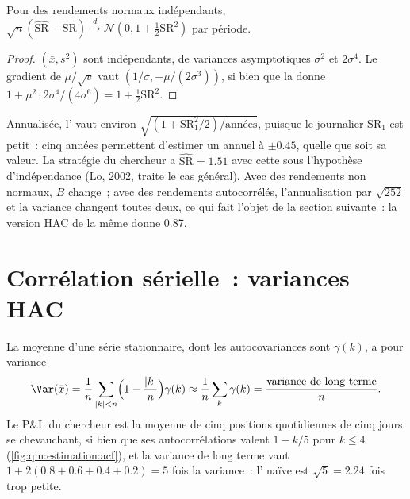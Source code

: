 \begin{proposition}\label{prop:qm:estimation:srse}
Pour des rendements normaux indépendants, $\sqrt n(\widehat{\mathrm{SR}} - \mathrm{SR}) \xrightarrow{d} \mathcal N(0, 1 + \tfrac12\mathrm{SR}^2)$ par période.
\end{proposition}

\begin{proof}
$(\bar x, s^2)$ sont indépendants, de variances asymptotiques $\sigma^2$ et $2\sigma^4$. Le gradient de $\mu/\sqrt v$ vaut $(1/\sigma,
-\mu/(2\sigma^3))$, si bien que la  donne $1 + \mu^2\cdot2\sigma^4/(4\sigma^6) = 1 + \tfrac12\mathrm{SR}^2$.
\end{proof}

Annualisée, l' vaut environ $\sqrt{(1 + \mathrm{SR}_1^2/2)/\text{années}}$, puisque le  journalier $\mathrm{SR}_1$ est petit~:
cinq années permettent d'estimer un  annuel à $\pm 0.45$, quelle que soit sa valeur. La stratégie du chercheur a $\widehat{\mathrm{SR}} = 1.51$
avec cette  sous l'hypothèse d'indépendance (Lo, 2002, traite le cas général). Avec des rendements non normaux, $B$ change~;
avec des rendements autocorrélés, l'annualisation par $\sqrt{252}$ et la variance changent toutes deux, ce qui fait l'objet de la section suivante~:
la version HAC de la même  donne 0.87.

\section{Corrélation sérielle~: variances HAC}

La moyenne d'une série stationnaire, dont les autocovariances sont $\gamma(k)$, a pour variance
\[
\Var(\bar x) = \frac1n\sum_{|k|<n}\Bigl(1 - \frac{|k|}n\Bigr)\gamma(k) \approx \frac1n\sum_k\gamma(k) = \frac{\text{variance de long terme}}n.
\]
Le P\&L du chercheur est la moyenne de cinq positions quotidiennes de cinq jours se chevauchant, si bien que ses autocorrélations valent $1 - k/5$ pour $k
\le 4$ (\cref{fig:qm:estimation:acf}), et la variance de long terme vaut $1 + 2(0.8 + 0.6 + 0.4 + 0.2) = 5$ fois la variance~: l' naïve est
$\sqrt5 = 2.24$ fois trop petite.

